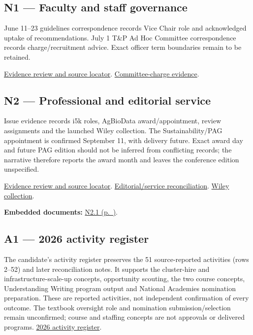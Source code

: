 \hypertarget{evidence-N1}{}
\subsection{N1 --- Faculty and staff governance}
June 11--23 guidelines correspondence records Vice Chair role and acknowledged uptake of recommendations. July 1 T\&P Ad Hoc Committee correspondence records charge/recruitment advice. Exact officer term boundaries remain to be retained.

\href{https://github.com/molikd/Molik-Tenure-Document/issues/4#issuecomment-5683209268}{Evidence review and source locator}.
\href{https://github.com/molikd/Molik-Tenure-Document/issues/4#issuecomment-5682992870}{Committee-charge evidence}.

\hypertarget{evidence-N2}{}
\subsection{N2 --- Professional and editorial service}
Issue evidence records i5k roles, AgBioData award/appointment, review assignments and the launched Wiley collection. The Sustainability/PAG appointment is confirmed September 11, with delivery future. Exact award day and future PAG edition should not be inferred from conflicting records; the narrative therefore reports the award month and leaves the conference edition unspecified.

\href{https://github.com/molikd/Molik-Tenure-Document/issues/4#issuecomment-5683515539}{Evidence review and source locator}.
\href{https://github.com/molikd/Molik-Tenure-Document/issues/4#issuecomment-5682646028}{Editorial/service reconciliation}.
\href{https://onlinelibrary.wiley.com/page/journal/20457758/call-for-papers/si-2026-000962}{Wiley collection}.

\par\medskip\noindent\textbf{Embedded documents:} \hyperref[supplement-N2.1]{N2.1 (p.~\pageref{supplement-N2.1})}.


\hypertarget{evidence-A1}{}
\subsection{A1 --- 2026 activity register}
The candidate's activity register preserves the 51 source-reported activities
(rows 2--52) and later reconciliation notes. It supports the cluster-hire and
infrastructure-scale-up concepts, opportunity scouting, the two course concepts,
Understanding Writing program output and National Academies nomination preparation.
These are reported activities, not independent confirmation of every outcome.
The textbook oversight role and nomination submission/selection remain unconfirmed;
course and staffing concepts are not approvals or delivered programs.
\href{https://github.com/molikd/Molik-Tenure-Document/blob/main/planning/2026-evidence-register.md}{2026 activity register}.



